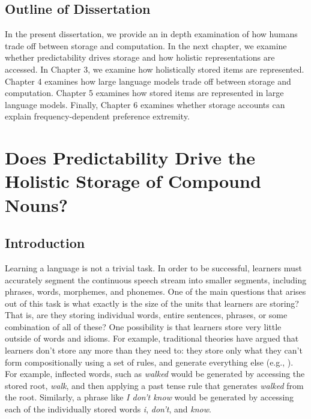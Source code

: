 \documentclass[
  12pt,
  letterpaper,
]{scrreprt}
\begin{document}
\section{Outline of Dissertation}\label{sec-outline-of-dissertation}

In the present dissertation, we provide an in depth examination of how
humans trade off between storage and computation. In the next chapter,
we examine whether predictability drives storage and how holistic
representations are accessed. In Chapter 3, we examine how holistically
stored items are represented. Chapter 4 examines how large language
models trade off between storage and computation. Chapter 5 examines how
stored items are represented in large language models. Finally, Chapter
6 examines whether storage accounts can explain frequency-dependent
preference extremity.


\chapter{Does Predictability Drive the Holistic Storage of Compound
Nouns?}\label{does-predictability-drive-the-holistic-storage-of-compound-nouns}

\section{Introduction}\label{introduction-1}

Learning a language is not a trivial task. In order to be successful,
learners must accurately segment the continuous speech stream into
smaller segments, including phrases, words, morphemes, and phonemes. One
of the main questions that arises out of this task is what exactly is
the size of the units that learners are storing? That is, are they
storing individual words, entire sentences, phrases, or some combination
of all of these? One possibility is that learners store very little
outside of words and idioms. For example, traditional theories have
argued that learners don't store any more than they need to: they store
only what they can't form compositionally using a set of rules, and
generate everything else (e.g., ). For example, inflected words, such as \emph{walked} would be
generated by accessing the stored root, \emph{walk}, and then applying a
past tense rule that generates \emph{walked} from the root. Similarly, a
phrase like \emph{I don't know} would be generated by accessing each of
the individually stored words \emph{i}, \emph{don't}, and \emph{know}.
\end{document}
